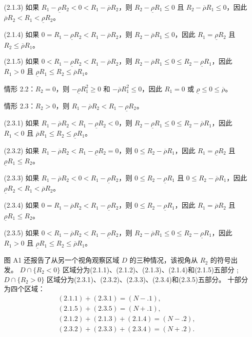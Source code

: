 \documentclass[10.0pt]{article}
\begin{document}
(2.1.3) 如果 $ R_1 - \underline{\rho} R_2 < 0 < R_1 - \overline{\rho} R_2 $，则 $ R_2 - \underline{\rho} R_1 \leqslant 0 $ 且 $ R_2 - \overline{\rho} R_1 \leqslant 0 $，因此 $ \overline{\rho} R_2 < R_1 < \underline{\rho} R_2 $。

(2.1.4) 如果 $ 0 = R_1 - \underline{\rho} R_2 < R_1 - \overline{\rho} R_2 $，则 $ R_2 - \overline{\rho} R_1 \leqslant 0 $，因此 $ R_1 = \underline{\rho} R_2 $ 且 $ R_2 \leqslant \overline{\rho} R_1 $。

(2.1.5) 如果 $ 0 < R_1 - \underline{\rho} R_2 < R_1 - \overline{\rho} R_2 $，则 $ R_2 - \overline{\rho} R_1 \leqslant 0 \leqslant R_2 - \underline {\rho} R_1 $，因此 $ R_1 > 0 $ 且 $ \underline{\rho} R_1 \leqslant R_2 \leqslant \overline{\rho} R_1 $。

情形 2.2：$ R_2 = 0 $，则 $ - \underline{\rho} R_1^2 \geqslant 0 $ 和 $ - \overline{\rho} R_1^2 \leqslant 0 $，因此 $ R_1 = 0 $ 或 $ \underline{\rho} \leqslant 0 \leqslant \overline{\rho} $。

情形 2.3：$ R_2 > 0 $，则 $ R_1 - \overline{\rho} R_2 < R_1 - \underline{\rho} R_2 $。

(2.3.1) 如果 $ R_1 - \overline{\rho} R_2 < R_1 - \underline{\rho} R_2 < 0 $，则 $ R_2 - \underline{\rho} R_1 \leqslant 0 \leqslant R_2 - \overline {\rho} R_1 $，因此 $ R_1 < 0 $ 且 $ \overline{\rho} R_1 \leqslant R_2 \leqslant \underline{\rho} R_1 $。

(2.3.2) 如果 $ R_1 - \overline{\rho} R_2 < R_1 - \underline{\rho} R_2 = 0 $，则 $ 0 \leqslant R_2 - \overline{\rho} R_1 $，因此 $ R_1 = \underline{\rho} R_2 $ 且 $ \underline{\rho} R_1 \leqslant R_2 $。

(2.3.3) 如果 $ R_1 - \overline{\rho} R_2 < 0 < R_1 - \underline{\rho} R_2 $，则 $ 0 \leqslant R_2 - \underline{\rho} R_1 $ 且 $ 0 \leqslant R_2 - \overline{\rho} R_1 $，因此 $ \underline{\rho} R_2 < R_1 < \overline{\rho} R_2 $。

(2.3.4) 如果 $ 0 = R_1 - \overline{\rho} R_2 < R_1 - \underline{\rho} R_2 $，则 $ 0 \leqslant R_2 - \underline{\rho} R_1 $，因此 $ R_1 = \overline{\rho} R_2 $ 且 $ \underline{\rho} R_1 \leqslant R_2 $。

(2.3.5) 如果 $ 0 < R_1 - \overline{\rho} R_2 < R_1 - \underline{\rho} R_2 $，则 $ R_2 - \overline{\rho} R_1 \leqslant 0 \leqslant R_2 - \underline {\rho} R_1 $，因此 $ R_1 > 0 $ 且 $ \underline{\rho} R_1 \leqslant R_2 \leqslant \overline{\rho} R_1 $。


图 A1 还报告了从另一个视角观察区域 $D$ 的三种情况，该视角从 $R_2$ 的符号出发。 $ D \cap \{ R_2 < 0 \} $ 区域分为(2.1.1)、(2.1.2)、(2.1.3)、(2.1.4)和(2.1.5)五部分 ; $ D \cap \{ R_2 > 0 \} $ 区域分为(2.3.1)、(2.3.2)、(2.3.3)、(2.3.4)和(2.3.5)五部分。 十部分为四个区域：
\begin{eqnarray*}
& (2.1.1) + (2.3.1) = (N-.1), & \\
& (2.1.5) + (2.3.5) = (N+.1), & \\
& (2.1.2) + (2.1.3) + (2.1.4) = (N-.2), & \\
& (2.3.2) + (2.3.3) + (2.3.4) = (N+.2). &
\end{eqnarray*}
\end{document}
